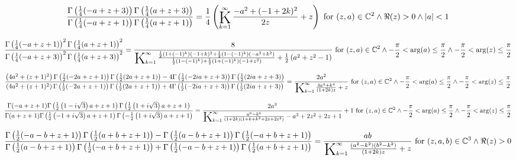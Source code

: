 \documentclass{article}
\newcommand{\bigK}{\mathop{\raisebox{-5pt}{\huge K}}}
\begin{document}
\[\frac{\Gamma \left(\frac{1}{4} (-a+z+3)\right) \Gamma \left(\frac{1}{4} (a+z+3)\right)}{\Gamma \left(\frac{1}{4} (-a+z+1)\right) \Gamma \left(\frac{1}{4} (a+z+1)\right)}=\frac{1}{4} \left(\bigK_{k=1}^{\infty}\frac{-a^2+(-1+2 k)^2}{2 z}+z\right)\text{ for }(z,a)\in \mathbb{C}^2\land \Re(z)>0\land \left| a\right| <1\] 

\[\frac{\Gamma \left(\frac{1}{4} (-a+z+1)\right)^2 \Gamma \left(\frac{1}{4} (a+z+1)\right)^2}{\Gamma \left(\frac{1}{4} (-a+z+3)\right)^2 \Gamma \left(\frac{1}{4} (a+z+3)\right)^2}=\frac{8}{\bigK_{k=1}^{\infty}\frac{\frac{1}{2} \left(1+(-1)^k\right) (-1+k)^2+\frac{1}{2} \left(1-(-1)^k\right) \left(-a^2+k^2\right)}{\frac{1}{2} \left(1-(-1)^k\right)+\frac{1}{2} \left(1+(-1)^k\right) \left(-1+z^2\right)}+\frac{1}{2} \left(a^2+z^2-1\right)}\text{ for }(z,a)\in \mathbb{C}^2\land -\frac{\pi }{2}<\arg (a)\leq \frac{\pi }{2}\land -\frac{\pi }{2}<\arg (z)\leq \frac{\pi }{2}\] 

\[\frac{\left(4 a^2+(z+1)^2\right) \Gamma \left(\frac{1}{2} (-2 a+z+1)\right) \Gamma \left(\frac{1}{2} (2 a+z+1)\right)-4 \Gamma \left(\frac{1}{2} (-2 i a+z+3)\right) \Gamma \left(\frac{1}{2} (2 i a+z+3)\right)}{\left(4 a^2+(z+1)^2\right) \Gamma \left(\frac{1}{2} (-2 a+z+1)\right) \Gamma \left(\frac{1}{2} (2 a+z+1)\right)+4 \Gamma \left(\frac{1}{2} (-2 i a+z+3)\right) \Gamma \left(\frac{1}{2} (2 i a+z+3)\right)}=\frac{2 a^2}{\bigK_{k=1}^{\infty}\frac{4 a^4+k^4}{(1+2 k) z}+z}\text{ for }(z,a)\in \mathbb{C}^2\land -\frac{\pi }{2}<\arg (a)\leq \frac{\pi }{2}\land -\frac{\pi }{2}<\arg (z)\leq \frac{\pi }{2}\] 

\[\frac{\Gamma (-a+z+1) \Gamma \left(\frac{1}{2} \left(1-i \sqrt{3}\right) a+z+1\right) \Gamma \left(\frac{1}{2} \left(1+i \sqrt{3}\right) a+z+1\right)}{\Gamma (a+z+1) \Gamma \left(\frac{1}{2} \left(-1+i \sqrt{3}\right) a+z+1\right) \Gamma \left(-\frac{1}{2} \left(1+i \sqrt{3}\right) a+z+1\right)}=\frac{2 a^3}{\bigK_{k=1}^{\infty}\frac{a^6-k^6}{(1+2 k) \left(1+k+k^2+2 z+2 z^2\right)}-a^3+2 z^2+2 z+1}+1\text{ for }(z,a)\in \mathbb{C}^2\land -\frac{\pi }{2}<\arg (a)\leq \frac{\pi }{2}\land -\frac{\pi }{2}<\arg (z)\leq \frac{\pi }{2}\] 

\[\frac{\Gamma \left(\frac{1}{2} (-a-b+z+1)\right) \Gamma \left(\frac{1}{2} (a+b+z+1)\right)-\Gamma \left(\frac{1}{2} (a-b+z+1)\right) \Gamma \left(\frac{1}{2} (-a+b+z+1)\right)}{\Gamma \left(\frac{1}{2} (a-b+z+1)\right) \Gamma \left(\frac{1}{2} (-a+b+z+1)\right)+\Gamma \left(\frac{1}{2} (-a-b+z+1)\right) \Gamma \left(\frac{1}{2} (a+b+z+1)\right)}=\frac{a b}{\bigK_{k=1}^{\infty}\frac{\left(a^2-k^2\right) \left(b^2-k^2\right)}{(1+2 k) z}+z}\text{ for }(z,a,b)\in \mathbb{C}^3\land \Re(z)>0\] 
\end{document}
